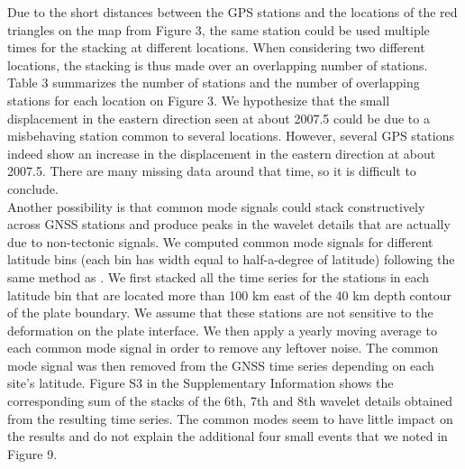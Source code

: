 \documentclass{article}
\begin{document}
Due to the short distances between the GPS stations and the locations of the red triangles on the map from Figure 3, the same station could be used multiple times for the stacking at different locations. When considering two different locations, the stacking is thus made over an overlapping number of stations. Table 3 summarizes the number of stations and the number of overlapping stations for each location on Figure 3. We hypothesize that the small displacement in the eastern direction seen at about 2007.5 could be due to a misbehaving station common to several locations. However, several GPS stations indeed show an increase in the displacement in the eastern direction at about 2007.5. There are many missing data around that time, so it is difficult to conclude. \\

Another possibility is that common mode signals could stack constructively across GNSS stations and produce peaks in the wavelet details that are actually due to non-tectonic signals. We computed common mode signals for different latitude bins (each bin has width equal to half-a-degree of latitude) following the same method as \citet{NUY_2021}. We first stacked all the time series for the stations in each latitude bin that are located more than 100 km east of the 40 km depth contour of the plate boundary. We assume that these stations are not sensitive to the deformation on the plate interface. We then apply a yearly moving average to each common mode signal in order to remove any leftover noise. The common mode signal was then removed from the GNSS time series depending on each site’s latitude. Figure S3 in the Supplementary Information shows the corresponding sum of the stacks of the 6th, 7th and 8th wavelet details obtained from the resulting time series. The common modes seem to have little impact on the results and do not explain the additional four small events that we noted in Figure 9. \\
\end{document}
